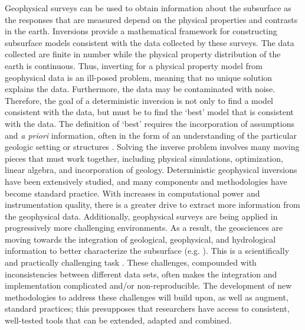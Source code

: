 \documentclass[11pt]{article}
\begin{document}
Geophysical surveys can be used to obtain information about the subsurface as the responses that are measured depend on the physical properties and contrasts in the earth. Inversions provide a mathematical framework for constructing subsurface models consistent with the data collected by these surveys. The data collected are finite in number while the physical property distribution of the earth is continuous. Thus, inverting for a physical property model from geophysical data is an ill-posed problem, meaning that no unique solution explains the data. Furthermore, the data may be contaminated with noise. Therefore, the goal of a deterministic inversion is not only to find a model consistent with the data, but must be to find the `best' model that is consistent with the data. The definition of `best' requires the incorporation of assumptions and \emph{a priori} information, often in the form of an understanding of the particular geologic setting or structures \citep{Constable1987, DougTutorial, lelievre2009integrating}. Solving the inverse problem involves many moving pieces that must work together, including physical simulations, optimization, linear algebra, and incorporation of geology. Deterministic geophysical inversions have been extensively studied, and many components and methodologies have become standard practice. With increases in computational power and instrumentation quality, there is a greater drive to extract more information from the geophysical data. Additionally, geophysical surveys are being applied in progressively more challenging environments. As a result, the geosciences are moving towards the integration of geological, geophysical, and hydrological information to better characterize the subsurface (e.g. \citep{ho,Doetsch2010,Gao2012}). This is a scientifically and practically challenging task \citep{Li2000a, lelievre2009integrating}. These challenges, compounded with inconsistencies between different data sets, often makes the integration and implementation complicated and/or non-reproducible. The development of new methodologies to address these challenges will build upon, as well as augment, standard practices; this presupposes that researchers have access to consistent, well-tested tools that can be extended, adapted and combined.
\end{document}
